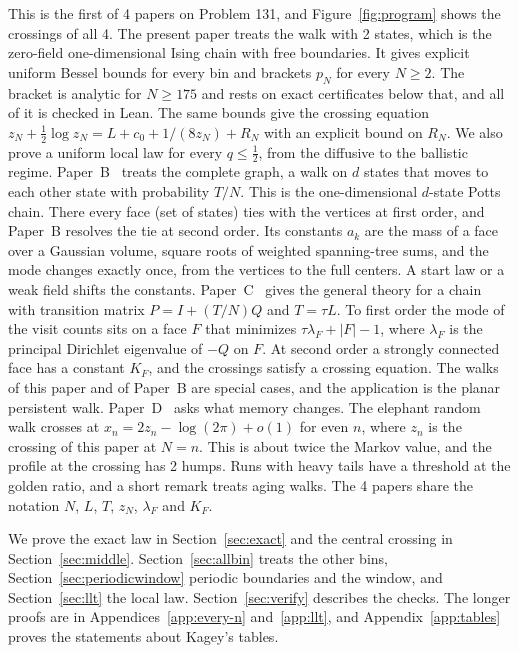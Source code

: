 \documentclass[11pt]{article}
\theoremstyle{definition}
\theoremstyle{remark}
\begin{document}
This is the first of 4 papers on Problem 131, and Figure~\ref{fig:program}
shows the crossings of all 4. The present paper treats the walk with 2
states, which is the zero-field one-dimensional Ising chain with free
boundaries. It gives explicit uniform Bessel bounds for every bin and brackets
$p_N$ for every $N\ge2$. The bracket is analytic for $N\ge175$ and rests on
exact certificates below that, and all of it is checked in Lean. The same
bounds give the crossing equation $z_N+\frac12\log z_N=L+c_0+1/(8z_N)+R_N$
with an explicit bound on $R_N$. We also prove a uniform local law for every $q\le\frac12$,
from the diffusive to the ballistic regime. Paper~B~\cite{paperB} treats the
complete graph, a walk on $d$ states that moves to each other state with
probability $T/N$. This is the one-dimensional $d$-state Potts chain. There
every face (set of states) ties with the vertices at first order, and
Paper~B resolves the tie at second order. Its constants $a_k$ are the mass of
a face over a Gaussian volume, square roots of weighted spanning-tree sums,
and the mode changes exactly once, from the vertices to the full centers. A
start law or a weak field shifts the constants. Paper~C~\cite{paperC} gives the general theory for a chain with
transition matrix $P=I+(T/N)Q$ and $T=\tau L$. To first order the mode of the
visit counts sits on a face $F$ that minimizes $\tau\lambda_F+|F|-1$, where
$\lambda_F$ is the principal Dirichlet eigenvalue of $-Q$ on $F$. At second
order a strongly connected face has a constant $K_F$, and the crossings
satisfy a crossing equation. The walks of this paper and of Paper~B are
special cases, and the application is the planar persistent walk.
Paper~D~\cite{paperD} asks what memory changes. The elephant random walk
crosses at $x_n=2z_n-\log(2\pi)+o(1)$ for even $n$, where $z_n$ is the
crossing of this paper at $N=n$. This is about twice the Markov value, and the profile at the
crossing has 2 humps. Runs with heavy tails have a threshold at the golden
ratio, and a short remark treats aging walks. The 4 papers share the notation
$N$, $L$, $T$, $z_N$, $\lambda_F$ and $K_F$.

We prove the exact law in Section~\ref{sec:exact} and the central crossing in
Section~\ref{sec:middle}. Section~\ref{sec:allbin} treats the other bins,
Section~\ref{sec:periodicwindow} periodic boundaries and the window, and
Section~\ref{sec:llt} the local law. Section~\ref{sec:verify} describes the
checks. The longer proofs are in Appendices~\ref{app:every-n}
and~\ref{app:llt}, and Appendix~\ref{app:tables} proves the statements about
Kagey's tables.
\end{document}
